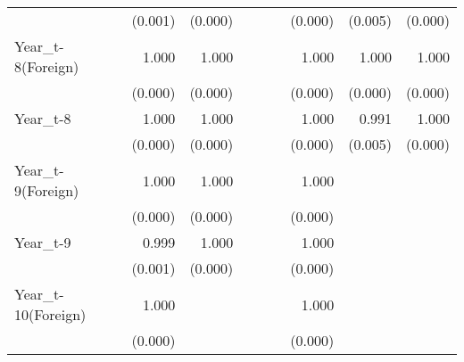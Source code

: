 \begin{table}[htbp]
\begin{tabular}{l*{8}{D{.}{.}{-1}}}
                    &     (0.001)         &     (0.000)         &                     &                     &                     &     (0.000)         &     (0.005)         &     (0.000)         \\
Year\_t-8(Foreign)   &       1.000\sym{*}  &       1.000\sym{*}  &                     &                     &                     &       1.000         &       1.000         &       1.000         \\
                    &     (0.000)         &     (0.000)         &                     &                     &                     &     (0.000)         &     (0.000)         &     (0.000)         \\
Year\_t-8            &       1.000         &       1.000\sym{\%}  &                     &                     &                     &       1.000\sym{*}  &       0.991\sym{*}  &       1.000\sym{**} \\
                    &     (0.000)         &     (0.000)         &                     &                     &                     &     (0.000)         &     (0.005)         &     (0.000)         \\
Year\_t-9(Foreign)   &       1.000         &       1.000         &                     &                     &                     &       1.000         &                     &                     \\
                    &     (0.000)         &     (0.000)         &                     &                     &                     &     (0.000)         &                     &                     \\
Year\_t-9            &       0.999         &       1.000\sym{**} &                     &                     &                     &       1.000         &                     &                     \\
                    &     (0.001)         &     (0.000)         &                     &                     &                     &     (0.000)         &                     &                     \\
Year\_t-10(Foreign)  &       1.000         &                     &                     &                     &                     &       1.000         &                     &                     \\
                    &     (0.000)         &                     &                     &                     &                     &     (0.000)         &                     &                     \\

\end{tabular}
\end{table}

